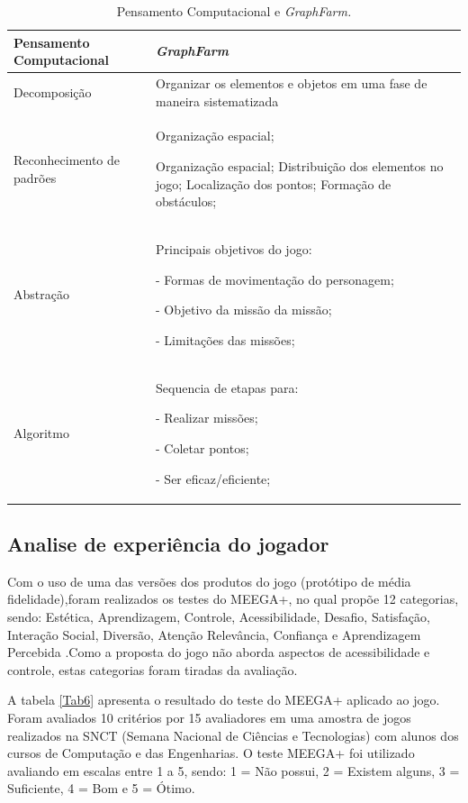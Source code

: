 \documentclass[10pt, conference, compsocconf]{IEEEtran}
\begin{document}
\begin{table}[!ht]
	\caption{Pensamento Computacional e \textit{GraphFarm.}}
	\begin{center}
		\begin{tabular}{|p{2.5cm}|p{5cm}|}
			\hline
			\textbf{Pensamento Computacional}&\textbf{\textit{GraphFarm}} \\
			\hline
			Decomposição & 
			Organizar os elementos e objetos em uma fase de maneira sistematizada\\
			\hline
			Reconhecimento de padrões & Organização espacial;
			
			Organização espacial;
			Distribuição dos elementos no jogo;
			Localização dos pontos;
			Formação de obstáculos;
			
			\\
			\hline
			Abstração & 
			Principais objetivos do jogo:
			
			- Formas de movimentação do personagem;
			
			- Objetivo da missão da missão;
			
			- Limitações das missões;
			
			\\
			\hline
			Algoritmo & 
			Sequencia de etapas para:
			
			- Realizar missões;
			
			- Coletar pontos;
			
			- Ser eficaz/eficiente;
			
			\\
			\hline
		\end{tabular}
		\label{tab2}
	\end{center}
\end{table}

\subsection{Analise de experiência do jogador}
Com o uso de uma das versões dos produtos do jogo (protótipo de média fidelidade),foram realizados os testes do MEEGA+, no qual propõe 12 categorias, sendo: Estética, Aprendizagem, Controle, Acessibilidade, Desafio, Satisfação, Interação Social, Diversão, Atenção Relevância, Confiança e Aprendizagem Percebida \cite{von2018meega+}.Como a proposta do jogo não aborda aspectos de acessibilidade e controle, estas categorias foram tiradas da avaliação.

A tabela \ref{Tab6} apresenta o resultado do teste do MEEGA+ aplicado ao jogo. Foram avaliados 10 critérios por 15 avaliadores em uma amostra de jogos realizados na SNCT (Semana Nacional de Ciências e Tecnologias) com alunos dos cursos de Computação e das Engenharias. O teste MEEGA+ foi utilizado avaliando em escalas entre 1 a 5, sendo: 1 = Não possui, 2 = Existem alguns, 3 = Suficiente, 4 = Bom e 5 = Ótimo.  
\end{document}
